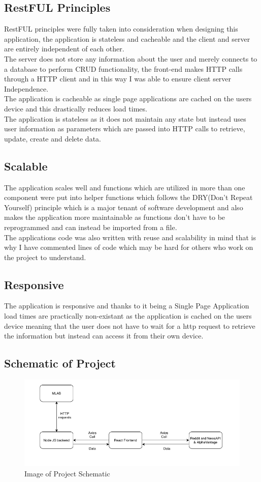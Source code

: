 \subsection{RestFUL Principles}
RestFUL principles were fully taken into consideration when designing this application,
the application is stateless and cacheable and the client and server are entirely independent of each other.
\\
 The server does not store any information
about the user and merely connects to a database to perform CRUD functionality, the
front-end makes HTTP calls through a HTTP client and in this way I was able to ensure
client server Independence.
\\
The application is cacheable as single page applications are cached on the users
device and this drastically reduces load times.
\\
The application is stateless as it does not maintain any state but instead uses
user information as parameters which are passed into HTTP calls to retrieve, update,
create and delete data.
\subsection{Scalable}
The application scales well and functions which are utilized in more than one component
were put into helper functions which follows the DRY(Don't Repeat Yourself) principle
which is a major tenant of software development and also makes the application more
maintainable as functions don't have to be reprogrammed and can instead be imported from
a file.
\\
The applications code was also written with reuse and scalability in mind that is why
I have commented lines of code which may be hard for others who work on the project to
understand.
\subsection{Responsive}
The application is responsive and thanks to it being a Single Page Application load times are
practically non-existant as the application is cached on the users device meaning that the
user does not have to wait for a http request to retrieve the information but instead can access
it from their own device.
\subsection{Schematic of Project}
\begin{figure}[hb]
\includegraphics[width=\textwidth]{img/projectdiagram.png}
\caption{Image of Project Schematic}
\label{fig:Image of Project Schematic}
\end{figure}
